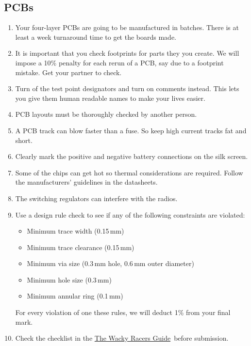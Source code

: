 \documentclass[11pt, a4paper]{article}
\newcommand{\theguide}{\href{https://eng-git.canterbury.ac.nz/wacky-racers/wacky-racers/-/blob/master/doc/guide/guide.pdf}{The Wacky Racers Guide}}
\begin{document}
\subsection{PCBs}

\begin{enumerate}
\item Your four-layer PCBs are going to be manufactured in batches.
  There is at least a week turnaround time to get the boards made.

\item It is important that you check footprints for parts they you
  create.  We will impose a 10\% penalty for each rerun of a PCB, say
  due to a footprint mistake.  Get your partner to check.

\item Turn of the test point designators and turn on comments
  instead. This lets you give them human readable names to make your
  lives easier.

\item PCB layouts must be thoroughly checked by another person.

\item A PCB track can blow faster than a fuse. So keep high current
  tracks fat and short.

\item Clearly mark the positive and negative battery connections on
  the silk screen.

\item Some of the chips can get hot so thermal considerations are
  required.  Follow the manufacturers' guidelines in the datasheets.

\item The switching regulators can interfere with the radios.

\item Use a design rule check to see if any of the following
  constraints are violated:
%
\begin{itemize}
\item Minimum trace width (0.15\,mm)
\item Minimum trace clearance (0.15\,mm)
\item Minimum via size (0.3\,mm hole, 0.6\,mm outer diameter)
\item Minimum hole size (0.3\,mm)
\item Minimum annular ring (0.1\,mm)
\end{itemize}
%
For every violation of one these rules, we will deduct 1\% from your
final mark.

\item Check the checklist in the \theguide\ before submission.
\end{enumerate}
\end{document}
